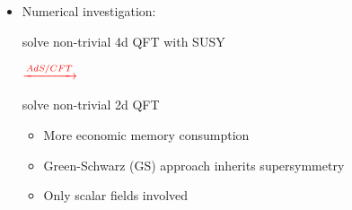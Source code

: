 \documentclass{beamer}
\begin{document}
{\begin{frame}
\begin{minipage}{0.3\linewidth}
\end{minipage}
\par
\vspace{2mm}
\begin{itemize}
\item[] Numerical investigation:\\[2mm]
\begin{minipage}{0.38\linewidth}
\begin{center}
\small solve non-trivial 4d QFT with SUSY
\end{center}
\end{minipage}
\begin{minipage}{0.18\linewidth}
$\xrightarrow{\color{red} AdS/CFT}{}$
\end{minipage}
\begin{minipage}{0.38\linewidth}
\small solve non-trivial 2d QFT
\end{minipage}
\vspace{2mm}
\begin{itemize}
\item More economic memory consumption 
\item Green-Schwarz (GS) approach inherits supersymmetry
\item Only scalar fields involved
\end{itemize}
\end{itemize}
\end{frame}
}


\end{document}
